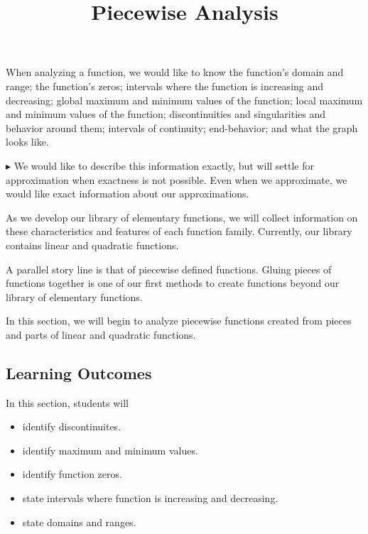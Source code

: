 \documentclass{ximera}
\title{Piecewise Analysis}
\begin{document}
\begin{abstract}
\end{abstract}
\maketitle




When analyzing a function, we would like to know the function's domain and range; the function's zeros; intervals where the function is increasing and decreasing; global maximum and minimum values of the function; local maximum and minimum values of the function; discontinuities and singularities and behavior around them; intervals of continuity; end-behavior; and what the graph looks like.


$\blacktriangleright$ We would like to describe this information exactly, but will settle for approximation when exactness is not possible. Even when we approximate, we would like exact information about our approximations.


As we develop our library of elementary functions, we will collect information on these characteristics and features of each function family.  Currently, our library contains linear and quadratic functions.  

A parallel story line is that of piecewise defined functions.  Gluing pieces of functions together is one of our first methods to create functions beyond our library of elementary functions.

In this section, we will begin to analyze piecewise functions created from pieces and parts of linear and quadratic functions.
















\subsection{Learning Outcomes}


\begin{sectionOutcomes}
In this section, students will 

\begin{itemize}
\item identify discontinuites.
\item identify maximum and minimum values.
\item identify function zeros.
\item state intervals where function is increasing and decreasing.
\item state domains and ranges.
\end{itemize}
\end{sectionOutcomes}
\end{document}
